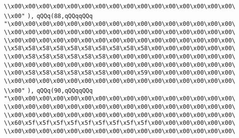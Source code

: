 \verb|\\x00\x00\x00\x00\x00\x00\x00\x00\x00\x00\x00\x00\x00\x00\x00\x00\|\newline
\verb|\\x00"|\newline
\verb|),|\newline
\verb|qQQq(88,qQQqqQQq|\newline
\verb|"\x00\x00\x00\x00\x00\x00\x00\x00\x00\x00\x00\x00\x00\x00\x00\x00\|\newline
\verb|\\x00\x00\x00\x00\x00\x00\x00\x00\x00\x00\x00\x00\x00\x00\x00\x00\|\newline
\verb|\\x00\x00\x00\x00\x00\x00\x00\x00\x00\x00\x00\x00\x00\x00\x00\x00\|\newline
\verb|\\x58\x58\x58\x58\x58\x58\x58\x58\x58\x58\x00\x00\x00\x00\x00\x00\|\newline
\verb|\\x00\x58\x58\x58\x58\x58\x58\x00\x00\x00\x00\x00\x00\x00\x00\x00\|\newline
\verb|\\x00\x00\x00\x00\x00\x00\x00\x00\x00\x00\x00\x00\x00\x00\x00\x00\|\newline
\verb|\\x00\x58\x58\x58\x58\x58\x58\x00\x00\x59\x00\x00\x00\x00\x00\x00\|\newline
\verb|\\x00\x00\x00\x00\x00\x00\x00\x00\x00\x00\x00\x00\x00\x00\x00\x00\|\newline
\verb|\\x00"|\newline
\verb|),|\newline
\verb|qQQq(90,qQQqqQQq|\newline
\verb|"\x00\x00\x00\x00\x00\x00\x00\x00\x00\x00\x00\x00\x00\x00\x00\x00\|\newline
\verb|\\x00\x00\x00\x00\x00\x00\x00\x00\x00\x00\x00\x00\x00\x00\x00\x00\|\newline
\verb|\\x00\x00\x00\x00\x00\x00\x00\x00\x00\x00\x00\x00\x00\x00\x00\x00\|\newline
\verb|\\x60\x5f\x5f\x5f\x5f\x5f\x5f\x5f\x5f\x5f\x00\x00\x00\x00\x00\x00\|\newline
\verb|\\x00\x00\x00\x00\x00\x00\x00\x00\x00\x00\x00\x00\x00\x00\x00\x00\|\newline
